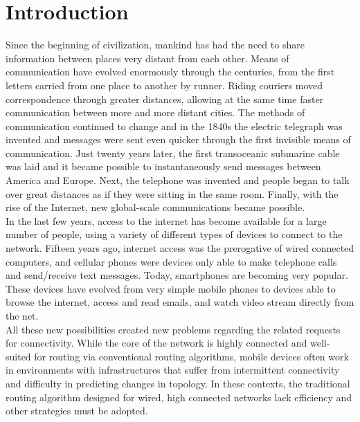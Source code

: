 
\chapter{Introduction}\label{introduzione} %





Since the beginning of civilization, mankind has had the need to share information between places very distant from each other. Means of communication have evolved enormously through the centuries, from the first letters carried from one place to another by runner. Riding couriers moved correspondence through greater distances, allowing at the same time faster communication between more and more distant cities. The methods of communication continued to change and in the 1840s the electric telegraph was invented and messages were sent even quicker through the first invisible means of communication. Just twenty years later, the first transoceanic submarine cable was laid and it became possible to instantaneously send messages between America and Europe. Next, the telephone was invented and people began to talk over great distances as if they were sitting in the same room. Finally, with the rise of the Internet, new global-scale communications became possible.
\\

In the last few years, access to the internet has become available for a large number of people, using a variety of different types of devices to connect to the network. Fifteen years ago, internet access was the prerogative of wired connected computers, and cellular phones were devices only able to make telephone calls and send/receive text messages. Today, smartphones are becoming very popular. These devices have evolved from very simple mobile phones to devices able to browse the internet, access and read emails, and watch video stream directly from the net.
\\

All these new possibilities created new problems regarding the related requests for connectivity. While the core of the network is highly connected and well-suited for routing via conventional routing algorithms, mobile devices often work in environments with infrastructures that suffer from intermittent connectivity and difficulty in predicting changes in topology. In these contexts, the traditional routing algorithm designed for wired, high connected networks lack efficiency and other strategies must be adopted.
\\

